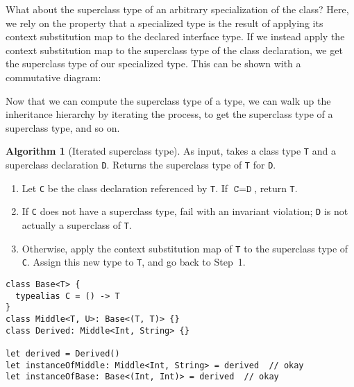 \documentclass[a4paper,headsepline,bibliography=totoc,toc=flat,fleqn,twoside=semi]{scrbook}
\theoremstyle{definition}
\theoremstyle{definition}
\theoremstyle{definition}
\newtheorem{algorithm}{Algorithm}[chapter]
\newcommand{\mathboxed}[1]{\boxed{\mbox{\vphantom{pI\texttt{pI}}#1}}}
\newcommand{\ifWIP}{\iffalse}
\begin{document}
What about the superclass type of an arbitrary specialization of the class? Here, we rely on the property that a specialized type is the result of applying its context substitution map to the declared interface type. If we instead apply the context substitution map to the superclass type of the class declaration, we get the superclass type of our specialized type. This can be shown with a commutative diagram:
\begin{quote}
\end{quote}

Now that we can compute the superclass type of a type, we can walk up the inheritance hierarchy by iterating the process, to get the superclass type of a superclass type, and so on.
\fi

\begin{algorithm}[Iterated superclass type]\label{superclassfordecl} As input, takes a class type \texttt{T} and a superclass declaration \texttt{D}. Returns the superclass type of \texttt{T} for \texttt{D}.
\begin{enumerate}
\item Let \texttt{C} be the class declaration referenced by \texttt{T}. If $\texttt{C}=\texttt{D}$, return \texttt{T}.
\item If \texttt{C} does not have a superclass type, fail with an invariant violation; \texttt{D} is not actually a superclass of \texttt{T}.
\item Otherwise, apply the context substitution map of \texttt{T} to the superclass type of \texttt{C}. Assign this new type to \texttt{T}, and go back to Step~1.
\end{enumerate}
\end{algorithm}

\ifWIP

\begin{listing}\label{generic superclass example listing}
\begin{Verbatim}
class Base<T> {
  typealias C = () -> T
}
class Middle<T, U>: Base<(T, T)> {}
class Derived: Middle<Int, String> {}

let derived = Derived()
let instanceOfMiddle: Middle<Int, String> = derived  // okay
let instanceOfBase: Base<(Int, Int)> = derived  // okay
\end{Verbatim}
\end{listing}
\end{document}

